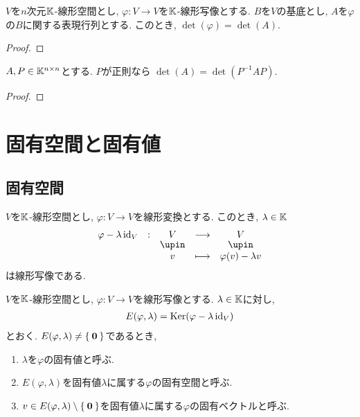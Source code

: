 \begin{prop}
  $V$を$n$次元$\mathbb{K}$-線形空間とし,
  $\varphi\colon V \to V$を$\mathbb{K}$-線形写像とする.
  $B$を$V$の基底とし,
  $A$を$\varphi$の$B$に関する表現行列とする.
  このとき,
  $\det(\varphi)=\det(A)$. 
\end{prop}
\begin{proof}\end{proof}

\begin{cor}
  $A, P \in \mathbb{K}^{n\times n}$とする.
  $P$が正則なら
  $\det(A)=\det(P^{-1}AP)$. 
\end{cor}
\begin{proof}\end{proof}


\begin{quiz}
\end{quiz}

\chapter{固有空間と固有値}
\section{固有空間}

$V$を$\mathbb{K}$-線形空間とし,
$\varphi\colon V\to V$を線形変換とする.
このとき, $\lambda\in \mathbb{K}$
\begin{align*}
  \shazo{\varphi-\lambda\id_V}{V}{V}
  {v}{\varphi(v)-\lambda v}
\end{align*}
は線形写像である.
\begin{definition}
  $V$を$\mathbb{K}$-線形空間とし,
  $\varphi\colon V\to V$を線形写像とする.
  $\lambda \in \mathbb{K}$に対し,
  \begin{align*}
    E(\varphi,\lambda) = \operatorname{Ker}(\varphi - \lambda\operatorname{id}_V)
  \end{align*}
  とおく.
  $E(\varphi,\lambda)\neq \Set{\boldsymbol{0}}$であるとき,
  \begin{enumerate}
  \item $\lambda$を$\varphi$の固有値と呼ぶ.
  \item $E(\varphi,\lambda)$を固有値$\lambda$に属する$\varphi$の固有空間と呼ぶ.
  \item $v\in E(\varphi,\lambda)\setminus\Set{\boldsymbol{0}}$を固有値$\lambda$に属する$\varphi$の固有ベクトルと呼ぶ.
  \end{enumerate}
\end{definition}

